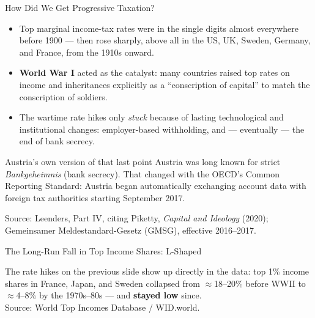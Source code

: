 \documentclass[11pt,aspectratio=169]{beamer}
\newcommand{\srcnote}[1]{{\footnotesize\color{wugray}Source: #1}}
\begin{document}
\begin{frame}{How Did We Get Progressive Taxation?}
  \small
  \begin{itemize}
    \item Top marginal income-tax rates were in the single digits almost everywhere before 1900 --- then rose sharply, above all in the US, UK, Sweden, Germany, and France, from the 1910s onward.
    \item \textbf{World War I} acted as the catalyst: many countries raised top rates on income and inheritances explicitly as a ``conscription of capital'' to match the conscription of soldiers.
    \item The wartime rate hikes only \emph{stuck} because of lasting technological and institutional changes: employer-based withholding, and --- eventually --- the end of bank secrecy.
  \end{itemize}
  \vspace{0.3em}
  \begin{alertblock}{Austria's own version of that last point}
    Austria was long known for strict \emph{Bankgeheimnis} (bank secrecy). That changed with the OECD's Common Reporting Standard: Austria began automatically exchanging account data with foreign tax authorities starting September 2017.
  \end{alertblock}
  \srcnote{Leenders, Part IV, citing Piketty, \emph{Capital and Ideology} (2020); Gemeinsamer Meldestandard-Gesetz (GMSG), effective 2016--2017.}
\end{frame}

\begin{frame}{The Long-Run Fall in Top Income Shares: L-Shaped}
  \begin{center}
  \end{center}
  \centering
  \footnotesize
  The rate hikes on the previous slide show up directly in the data: top 1\% income shares in France, Japan, and Sweden collapsed from \(\approx\)18--20\% before WWII to \(\approx\)4--8\% by the 1970s--80s --- and \textbf{stayed low} since.\\
  \srcnote{World Top Incomes Database / WID.world.}
\end{frame}
\end{document}
